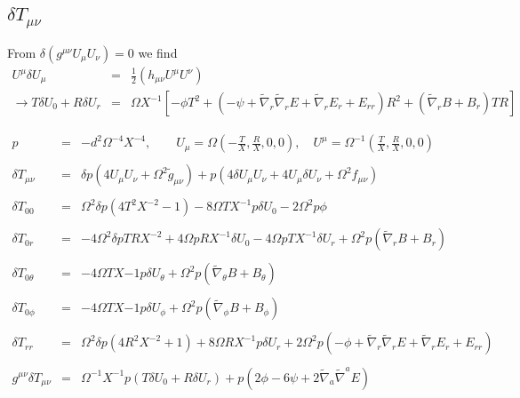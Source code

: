 \documentclass[10pt,letterpaper]{article}
\numberwithin{equation}{section}
\begin{document}
\subsection{$\delta T_{\mu\nu}$}
From $\delta(g^{\mu\nu}U_\mu U_\nu)=0$ we find
\begin{eqnarray}
U^\mu \delta U_\mu &=& \frac12 \left( h_{\mu\nu} U^\mu U^\nu\right)
\nonumber\\
\to T\delta U_0 + R\delta U_r &=& \Omega X^{-1} \left[ -\phi T^2 + (-\psi + \tilde\nabla_r\tilde\nabla_r E + \tilde\nabla_r E_r + E_{rr})R^2 + (\tilde\nabla_r B + B_r)TR\right]
\end{eqnarray}

\begin{eqnarray}
p &=& -d^2 \Omega^{-4} X^{-4},\qquad U_\mu = \Omega \left( -\frac{T}{X},\frac{R}{X},0,0\right),\quad U^\mu = \Omega^{-1}\left(\frac{T}{X},\frac{R}{X},0,0\right)
\\ \nonumber\\
 \delta T_{\mu\nu} &=& \delta p(4 U_\mu U_\nu + \Omega^2\tilde g_{\mu\nu})+ p\left(
4 \delta U_\mu U_\nu + 4U_\mu \delta U_\nu + \Omega^2 f_{\mu\nu}\right)
\\ \nonumber\\
 \delta T_{00} &=& \Omega^2 \delta p (4T^2X^{-2} -1) -8\Omega T X^{-1} p \delta U_0 - 2\Omega^2 p \phi
\\ \nonumber\\
 \delta T_{0r} &=& -4\Omega^2 \delta p TR X^{-2} + 4\Omega p R X^{-1} \delta U_0 - 4\Omega p T X^{-1} \delta U_r
+\Omega^2 p(\tilde\nabla_r B + B_r)
\\ \nonumber\\
\delta T_{0\theta}&=& -4\Omega T X{-1} p \delta U_\theta + \Omega^2 p (\tilde\nabla_\theta B + B_\theta)
\\ \nonumber\\
\delta T_{0\phi}&=& -4\Omega T X{-1} p \delta U_\phi + \Omega^2 p (\tilde\nabla_\phi B + B_\phi)
\\ \nonumber\\
\delta T_{rr} &=& \Omega^2 \delta p (4R^2 X^{-2}+1) + 8\Omega R X^{-1} p \delta U_r + 
2\Omega^2 p(-\phi + \tilde\nabla_r\tilde\nabla_r E + \tilde\nabla_r E_r + E_{rr})
\\ \nonumber\\
g^{\mu\nu}\delta T_{\mu\nu} &=& \Omega^{-1} X^{-1}p(T\delta U_0 + R\delta U_r) + p(2\phi -6\psi+2\tilde\nabla_a\tilde\nabla^a E)
\end{eqnarray}
\end{document}
